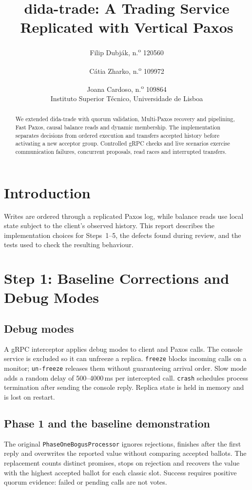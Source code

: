 \documentclass[times,10pt,twocolumn]{article}
\newcommand{\code}[1]{\texttt{\small #1}}
\begin{document}
\title{dida-trade: A Trading Service Replicated with Vertical Paxos}
\author{Filip Dubj\'ak, n.\textsuperscript{o} 120560 \and
        C\'atia Zharko, n.\textsuperscript{o} 109972 \and
        Joana Cardoso, n.\textsuperscript{o} 109864 \\[4pt]
        Instituto Superior T\'ecnico, Universidade de Lisboa}
\maketitle
\thispagestyle{empty}

\begin{abstract}
We extended dida-trade with quorum validation, Multi-Paxos recovery and
pipelining, Fast Paxos, causal balance reads and dynamic membership.
The implementation separates decisions from ordered execution and transfers
accepted history before activating a new acceptor group. Controlled gRPC
checks and live scenarios exercise communication failures, concurrent
proposals, read races and interrupted transfers.
\end{abstract}

\section{Introduction}
Writes are ordered through a replicated Paxos log, while balance reads use
local state subject to the client's observed history. This report describes
the implementation choices for Steps~1--5, the defects found during review,
and the tests used to check the resulting behaviour.

\section{Step 1: Baseline Corrections and Debug Modes}
\label{sec:step1}

\subsection{Debug modes}
A gRPC interceptor applies debug modes to client and Paxos calls. The console
service is excluded so it can unfreeze a replica. \code{freeze} blocks incoming
calls on a monitor; \code{un-freeze} releases them without guaranteeing arrival
order. Slow mode adds a random delay of 500--4000\,ms per intercepted call.
\code{crash} schedules process termination after sending the console reply.
Replica state is held in memory and is lost on restart.

\subsection{Phase 1 and the baseline demonstration}
The original \code{PhaseOneBogusProcessor} ignores rejections, finishes after
the first reply and overwrites the reported value without comparing accepted
ballots. The replacement counts distinct promises, stops on rejection and
recovers the value with the highest accepted ballot for each classic slot.
Success requires positive quorum evidence: failed or pending calls are not votes.
\end{document}
